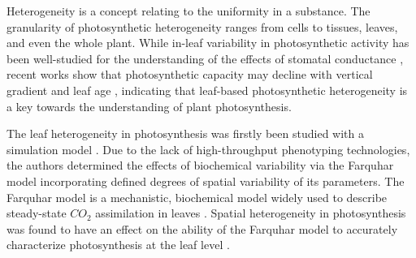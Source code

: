 Heterogeneity is a concept relating to the uniformity in a substance. The granularity of photosynthetic heterogeneity ranges from cells to tissues, leaves, and even the whole plant. While in-leaf variability in photosynthetic activity has been well-studied for the understanding of the effects of stomatal conductance \cite{Buckley1997,Cheeseman1991}, recent works show that photosynthetic capacity may decline with vertical gradient and leaf age \cite{chen2008effect,Kitajima2002}, indicating that leaf-based photosynthetic heterogeneity is a key towards the understanding of plant photosynthesis.

The leaf heterogeneity in photosynthesis was firstly been studied  with a simulation model \cite{chen2008effect}. Due to the lack of high-throughput phenotyping technologies, the authors determined the effects of biochemical variability via the Farquhar model incorporating defined degrees of spatial variability of its parameters. The Farquhar model is a mechanistic, biochemical model widely used to describe steady-state $CO_2$ assimilation in leaves \cite{farquhar2001models,sharkey1985o2}. Spatial heterogeneity in photosynthesis was found to have an effect on the ability of the Farquhar model to accurately characterize photosynthesis at the leaf level \cite{chen2008effect}.

